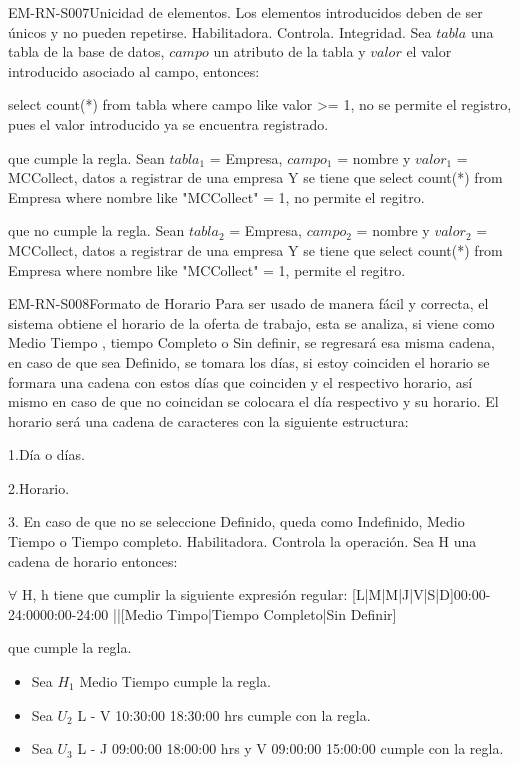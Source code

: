 \begin{BussinesRule}{EM-RN-S007}{Unicidad de elementos.} 
	\BRitem[Descripción:] Los elementos introducidos deben de ser únicos y no pueden repetirse. 
	\BRitem[Tipo:] Habilitadora.
	\BRitem[Nivel:] Controla.
	\BRitem[Clase:] Integridad.
	\BRitem[Sentenia:] Sea $tabla$ una tabla de la base de datos, $campo$ un atributo de la tabla y $valor$ el valor introducido asociado al campo, entonces:
	\begin{center}
		select count(*) from tabla where campo like valor >= 1, no se permite el registro, pues el valor introducido ya se encuentra registrado.
	\end{center}
	 que cumple la regla.
		Sean $tabla_{1}$ = Empresa, $campo_{1}$ = nombre y $valor_{1}$ = MCCollect, datos a registrar de una empresa
		Y se tiene que select count(*) from Empresa where nombre like "MCCollect" = 1, no permite el regitro. 

	 que no cumple la regla.
		Sean $tabla_{2}$ = Empresa, $campo_{2}$ = nombre y $valor_{2}$ = MCCollect, datos a registrar de una empresa
		Y se tiene que select count(*) from Empresa where nombre like "MCCollect" = 1, permite el regitro. 
\end{BussinesRule}


\begin{BussinesRule}{EM-RN-S008}{Formato de Horario}
	\BRitem[Descripción:] Para ser usado de manera fácil y correcta, el sistema obtiene el horario de la oferta de trabajo, esta se analiza, si viene como Medio Tiempo , tiempo Completo o Sin definir, se regresará esa misma cadena, en caso de que sea Definido, se tomara  los días, si estoy coinciden el horario se formara una cadena con estos días que coinciden y el respectivo horario, así mismo en caso de que no coincidan se colocara el día respectivo y su horario. El horario será una cadena de caracteres con la siguiente estructura:

1.Día o días.

2.Horario.

3. En caso de que no se seleccione Definido, queda como Indefinido, Medio Tiempo o Tiempo completo.
	\BRitem[Tipo:] Habilitadora.
	\BRitem[Nivel:] Controla la operación.
	\BRitem[Sentencia:] Sea H una cadena de horario  entonces: 
	\begin{center}
		$\forall$ H, h tiene que cumplir la siguiente expresión regular: [L|M|M|J|V|S|D]{00:00-24:00}{00:00-24:00} ||[Medio Timpo|Tiempo Completo|Sin Definir]
	\end{center}
	 que cumple la regla.
		\begin{itemize}
			\item Sea $H_{1}$ Medio Tiempo cumple la regla.
			\item Sea $U_{2}$ L - V 10:30:00 18:30:00 hrs cumple con la regla.
			\item Sea $U_{3}$ L - J 09:00:00 18:00:00 hrs y V 09:00:00 15:00:00 cumple con la regla.
		\end{itemize}

\end{BussinesRule}	

